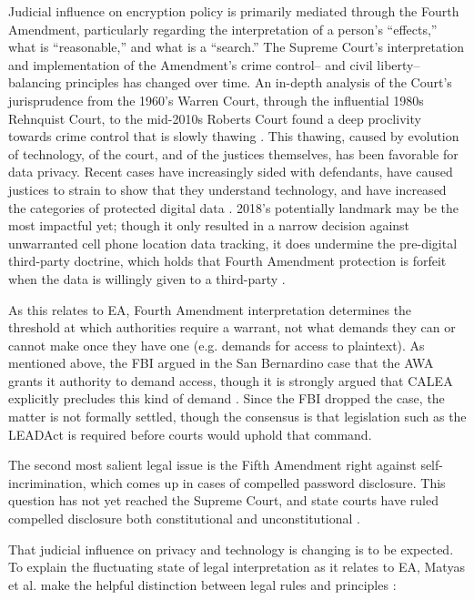 Judicial influence on encryption policy is primarily mediated through the Fourth Amendment, particularly regarding the
interpretation of a person's ``effects,'' what is ``reasonable,'' and what is a ``search.'' The Supreme Court's
interpretation and implementation of the Amendment's crime control-- and civil liberty--balancing principles has changed
over time. An in-depth analysis of the Court's jurisprudence from the 1960's Warren Court, through the influential 1980s
Rehnquist Court, to the mid-2010s Roberts Court found a deep proclivity towards crime control that is slowly thawing
\cite{gizzi_fourth_2016}. This thawing, caused by evolution of technology, of the court, and of the justices themselves,
has been favorable for data privacy. Recent cases have increasingly sided with defendants, have caused justices to
strain to show that they understand technology, and have increased the categories of protected digital data
\cite{gizzi_fourth_2016}. 2018's potentially landmark  may be the most impactful yet;
though it only resulted in a narrow decision against unwarranted cell phone location data tracking, it does undermine
the pre-digital third-party doctrine, which holds that Fourth Amendment protection is forfeit when the data is willingly
given to a third-party \cite{franklin_2018}.

As this relates to \ac{EA}, Fourth Amendment interpretation determines the threshold at which authorities require a
warrant, not what demands they can or cannot make once they have one (e.g. demands for access to \ac{plaintext}). As
mentioned above, the FBI argued in the San Bernardino case that the \ac{AWA} grants it authority to demand access,
though it is strongly argued that \acs{CALEA} explicitly precludes this kind of demand \cite{gidari_2016}. Since the FBI
dropped the case, the matter is not formally settled, though the consensus is that legislation such as the \ac{LEADAct}
is required before courts would uphold that command.

The second most salient legal issue is the Fifth Amendment right against self-incrimination, which comes up in cases of
compelled password disclosure. This question has not yet reached the Supreme Court, and state courts have ruled
compelled disclosure both constitutional \cite{sobel_2019} \cite{lee_nj_2020} and unconstitutional \cite{lee_its_2020}
\cite{vaas_2019}.

That judicial influence on privacy and technology is changing is to be expected. To explain the fluctuating state of
legal interpretation as it relates to \ac{EA}, Matyas et al. make the helpful distinction between legal rules and
principles \cite{matyas_incommensurability_2018}:

